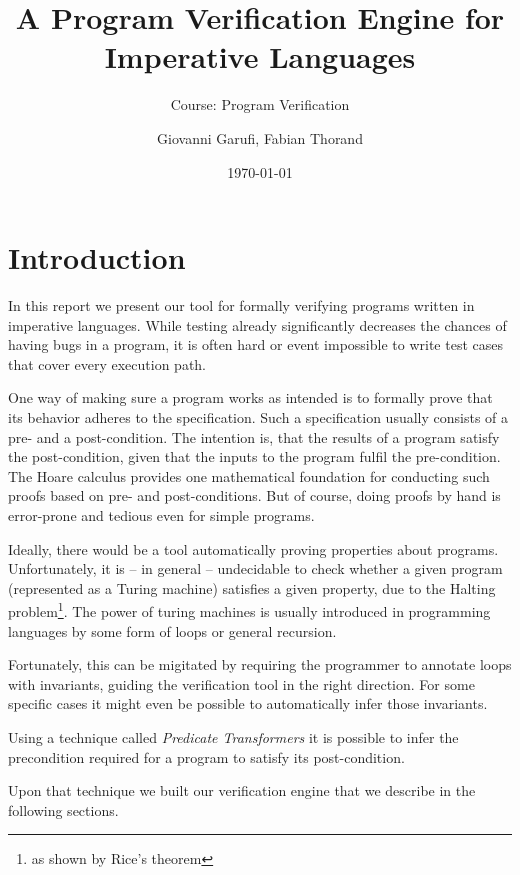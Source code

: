 \documentclass[]{scrartcl}
\title{A Program Verification Engine for Imperative Languages}
\subtitle{Course: Program Verification}
\author{Giovanni Garufi, Fabian Thorand}
\date{\today}
\begin{document}
\maketitle

\tableofcontents

\section{Introduction}

In this report we present our tool for formally verifying programs written in
imperative languages. While testing already significantly decreases the chances
of having bugs in a program, it is often hard or event impossible to write test
cases that cover every execution path.

One way of making sure a program works as intended is to formally prove that its
behavior adheres to the specification.
Such a specification usually consists of a pre- and a post-condition.
The intention is, that the results of a program satisfy the post-condition,
given that the inputs to the program fulfil the pre-condition.
The Hoare calculus provides one mathematical foundation for conducting such
proofs based on pre- and post-conditions.
But of course, doing proofs by hand is error-prone and tedious even for
simple programs.

Ideally, there would be a tool automatically proving properties about programs.
Unfortunately, it is -- in general -- undecidable to check whether a given
program (represented as a Turing machine) satisfies a given property, due to the
Halting problem\footnote{as shown by Rice's theorem}.
The power of turing machines is usually introduced in programming languages
by some form of loops or general recursion.

Fortunately, this can be migitated by requiring the programmer to annotate loops
with invariants, guiding the verification tool in the right direction.
For some specific cases it might even be possible to automatically infer those
invariants.

Using a technique called \emph{Predicate Transformers} it is possible to infer
the precondition required for a program to satisfy its post-condition.

Upon that technique we built our verification engine that we describe in the
following sections.
\end{document}

